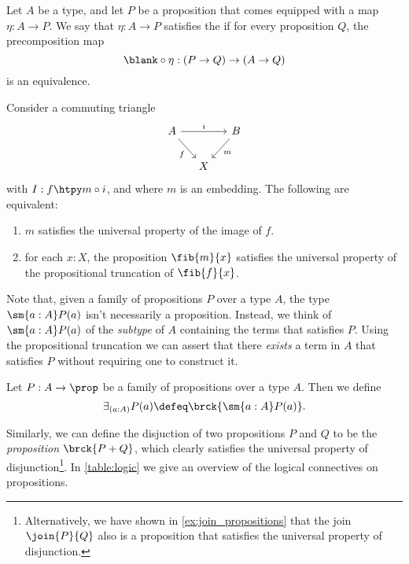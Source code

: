 \begin{defn}
Let $A$ be a type, and let $P$ be a proposition that comes equipped with a map $\eta:A\to P$. We say that $\eta:A\to P$ satisfies the  if for every proposition $Q$, the precomposition map
\begin{equation*}
\blank\circ\eta:(P\to Q)\to (A\to Q)
\end{equation*}
is an equivalence.
\end{defn}

\begin{thm}
Consider a commuting triangle
\begin{equation*}
\begin{tikzcd}[column sep=small]
A \arrow[rr,"i"] \arrow[dr,swap,"f"] & & B \arrow[dl,"m"] \\
& X
\end{tikzcd}
\end{equation*}
with $I:f\htpy m\circ i$, and where $m$ is an embedding. The following are equivalent:
\begin{enumerate}
\item $m$ satisfies the universal property of the image of $f$.
\item for each $x:X$, the proposition $\fib{m}{x}$ satisfies the universal property of the propositional truncation of $\fib{f}{x}$.
\end{enumerate}
\end{thm}


Note that, given a family of propositions $P$ over a type $A$, the type $\sm{a:A}P(a)$ isn't necessarily a proposition. Instead, we think of $\sm{a:A}P(a)$ of the \emph{subtype} of $A$ containing the terms that satisfies $P$. Using the propositional truncation we can assert that there \emph{exists} a term in $A$ that satisfies $P$ without requiring one to construct it. 

\begin{defn}
Let $P:A\to \prop$ be a family of propositions over a type $A$. Then we define
\begin{equation*}
\exists_{(a:A)}P(a)\defeq \brck{\sm{a:A}P(a)}.
\end{equation*}
\end{defn}

Similarly, we can define the disjuction of two propositions $P$ and $Q$ to be the \emph{proposition} $\brck{P+Q}$, which clearly satisfies the universal property of disjunction\footnote{Alternatively, we have shown in \cref{ex:join_propositions} that the join $\join{P}{Q}$ also is a proposition that satisfies the universal property of disjunction.}. In \cref{table:logic} we give an overview of the logical connectives on propositions.

